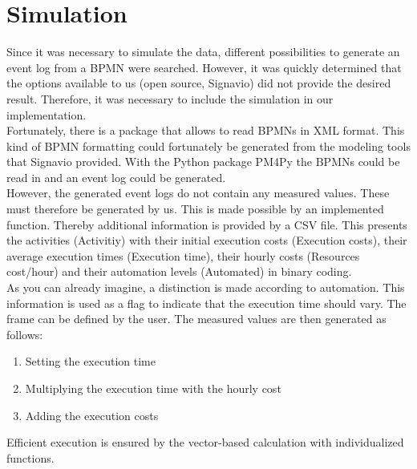     \section{Simulation}
    Since it was necessary to simulate the data, different possibilities to generate an event log from a BPMN were searched. However, it was quickly determined that the options available to us (open source, Signavio) did not provide the desired result. Therefore, it was necessary to include the simulation in our implementation.\\
    Fortunately, there is a package that allows to read BPMNs in XML format. This kind of BPMN formatting could fortunately be generated from the modeling tools that Signavio provided. With the Python package PM4Py the BPMNs could be read in and an event log could be generated.\\
    However, the generated event logs do not contain any measured values. These must therefore be generated by us. This is made possible by an implemented function. Thereby additional information is provided by a CSV file. This presents the activities (Activitiy) with their initial execution costs (Execution costs), their average execution times (Execution time), their hourly costs (Resources cost/hour) and their automation levels (Automated) in binary coding.\\
    As you can already imagine, a distinction is made according to automation. This information is used as a flag to indicate that the execution time should vary. The frame can be defined by the user. The measured values are then generated as follows:
    \begin{enumerate}
        \item Setting the execution time
        \item Multiplying the execution time with the hourly cost
        \item Adding the execution costs
    \end{enumerate}
    Efficient execution is ensured by the vector-based calculation with individualized functions.

